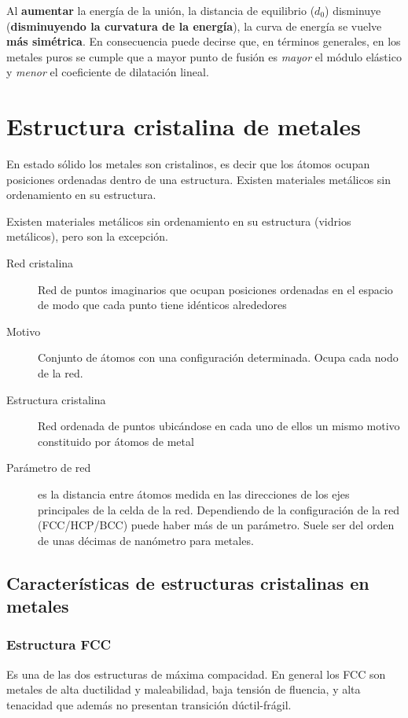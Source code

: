 Al \textbf{aumentar} la energía de la unión, la distancia de equilibrio ($d_0$) disminuye (\textbf{disminuyendo la curvatura de la energía}), la curva de energía se vuelve \textbf{más simétrica}. En consecuencia puede decirse que, en términos generales, en los metales puros se cumple que a mayor punto de fusión es \textit{mayor} el módulo elástico y \textit{menor} el coeficiente de dilatación lineal.

\section{Estructura cristalina de metales}

En estado sólido los metales son cristalinos, es decir que los átomos ocupan posiciones ordenadas dentro de una estructura. Existen materiales metálicos sin ordenamiento en su estructura.

Existen materiales metálicos sin ordenamiento en su estructura (vidrios metálicos), pero son la excepción.

\begin{description}
    \item[Red cristalina] Red de puntos imaginarios que ocupan posiciones ordenadas en el espacio de modo que cada punto tiene idénticos alrededores
    \item[Motivo] Conjunto de átomos con una configuración determinada. Ocupa cada nodo de la red.
    \item[Estructura cristalina]  Red ordenada de puntos ubicándose en cada uno de ellos un mismo motivo constituido por átomos de metal
    \item[Parámetro de red] es la distancia entre átomos medida en las direcciones de los ejes principales de la celda de la red. Dependiendo de la configuración de la red (FCC/HCP/BCC) puede haber más de un parámetro. Suele ser del orden de unas décimas de nanómetro para metales.
\end{description}

\subsection{Características de estructuras cristalinas en metales}

\subsubsection{Estructura FCC}
Es una de las dos estructuras de máxima compacidad.
En general los FCC son metales de alta ductilidad y maleabilidad, baja tensión de fluencia, y alta tenacidad que además no presentan transición dúctil-frágil. 

